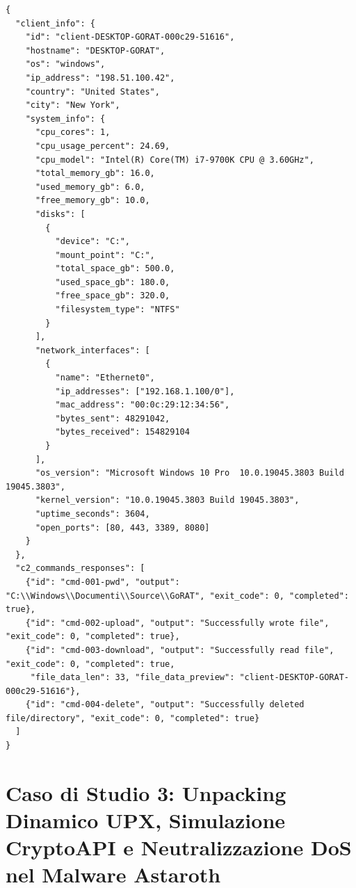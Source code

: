 \documentclass[11pt, a4paper]{article}
\begin{document}
\begin{lstlisting}[style=consoleout, caption={Contenuto integrale del report C2 decodificato automaticamente da Protocol Buffers (gorat\_c2\_full\_report.json).}, label={lst:gorat_json}]
{
  "client_info": {
    "id": "client-DESKTOP-GORAT-000c29-51616",
    "hostname": "DESKTOP-GORAT",
    "os": "windows",
    "ip_address": "198.51.100.42",
    "country": "United States",
    "city": "New York",
    "system_info": {
      "cpu_cores": 1,
      "cpu_usage_percent": 24.69,
      "cpu_model": "Intel(R) Core(TM) i7-9700K CPU @ 3.60GHz",
      "total_memory_gb": 16.0,
      "used_memory_gb": 6.0,
      "free_memory_gb": 10.0,
      "disks": [
        {
          "device": "C:",
          "mount_point": "C:",
          "total_space_gb": 500.0,
          "used_space_gb": 180.0,
          "free_space_gb": 320.0,
          "filesystem_type": "NTFS"
        }
      ],
      "network_interfaces": [
        {
          "name": "Ethernet0",
          "ip_addresses": ["192.168.1.100/0"],
          "mac_address": "00:0c:29:12:34:56",
          "bytes_sent": 48291042,
          "bytes_received": 154829104
        }
      ],
      "os_version": "Microsoft Windows 10 Pro  10.0.19045.3803 Build 19045.3803",
      "kernel_version": "10.0.19045.3803 Build 19045.3803",
      "uptime_seconds": 3604,
      "open_ports": [80, 443, 3389, 8080]
    }
  },
  "c2_commands_responses": [
    {"id": "cmd-001-pwd", "output": "C:\\Windows\\Documenti\\Source\\GoRAT", "exit_code": 0, "completed": true},
    {"id": "cmd-002-upload", "output": "Successfully wrote file", "exit_code": 0, "completed": true},
    {"id": "cmd-003-download", "output": "Successfully read file", "exit_code": 0, "completed": true,
     "file_data_len": 33, "file_data_preview": "client-DESKTOP-GORAT-000c29-51616"},
    {"id": "cmd-004-delete", "output": "Successfully deleted file/directory", "exit_code": 0, "completed": true}
  ]
}
\end{lstlisting}

\section{Caso di Studio 3: Unpacking Dinamico UPX, Simulazione CryptoAPI e Neutralizzazione DoS nel Malware Astaroth}
\end{document}
